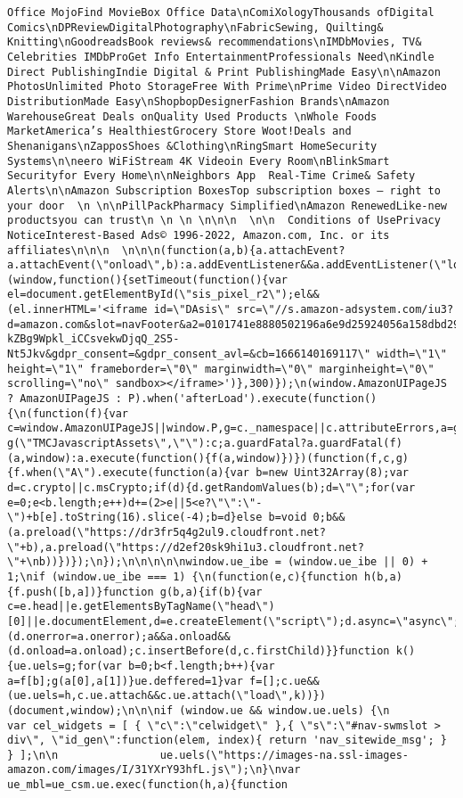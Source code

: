 \documentclass[
]{article}
\begin{document}
\begin{verbatim}
Office MojoFind MovieBox Office Data\nComiXologyThousands ofDigital Comics\nDPReviewDigitalPhotography\nFabricSewing, Quilting& Knitting\nGoodreadsBook reviews& recommendations\nIMDbMovies, TV& Celebrities IMDbProGet Info EntertainmentProfessionals Need\nKindle Direct PublishingIndie Digital & Print PublishingMade Easy\n\nAmazon PhotosUnlimited Photo StorageFree With Prime\nPrime Video DirectVideo DistributionMade Easy\nShopbopDesignerFashion Brands\nAmazon WarehouseGreat Deals onQuality Used Products \nWhole Foods MarketAmerica’s HealthiestGrocery Store Woot!Deals and Shenanigans\nZapposShoes &Clothing\nRingSmart HomeSecurity Systems\n\neero WiFiStream 4K Videoin Every Room\nBlinkSmart Securityfor Every Home\n\nNeighbors App  Real-Time Crime& Safety Alerts\n\nAmazon Subscription BoxesTop subscription boxes – right to your door  \n \n\nPillPackPharmacy Simplified\nAmazon RenewedLike-new productsyou can trust\n \n \n \n\n\n  \n\n  Conditions of UsePrivacy NoticeInterest-Based Ads© 1996-2022, Amazon.com, Inc. or its affiliates\n\n\n  \n\n\n(function(a,b){a.attachEvent?a.attachEvent(\"onload\",b):a.addEventListener&&a.addEventListener(\"load\",b,!1)})(window,function(){setTimeout(function(){var el=document.getElementById(\"sis_pixel_r2\");el&&(el.innerHTML='<iframe id=\"DAsis\" src=\"//s.amazon-adsystem.com/iu3?d=amazon.com&slot=navFooter&a2=0101741e8880502196a6e9d25924056a158dbd29152e5289938ec3621c92db7314d9&old_oo=0&ts=1666140169117&s=AbzuPUrBlz-kZBg9Wpkl_iCCsvekwDjqQ_2S5-Nt5Jkv&gdpr_consent=&gdpr_consent_avl=&cb=1666140169117\" width=\"1\" height=\"1\" frameborder=\"0\" marginwidth=\"0\" marginheight=\"0\" scrolling=\"no\" sandbox></iframe>')},300)});\n(window.AmazonUIPageJS ? AmazonUIPageJS : P).when('afterLoad').execute(function() {\n(function(f){var c=window.AmazonUIPageJS||window.P,g=c._namespace||c.attributeErrors,a=g?g(\"TMCJavascriptAssets\",\"\"):c;a.guardFatal?a.guardFatal(f)(a,window):a.execute(function(){f(a,window)})})(function(f,c,g){f.when(\"A\").execute(function(a){var b=new Uint32Array(8);var d=c.crypto||c.msCrypto;if(d){d.getRandomValues(b);d=\"\";for(var e=0;e<b.length;e++)d+=(2>e||5<e?\"\":\"-\")+b[e].toString(16).slice(-4);b=d}else b=void 0;b&&(a.preload(\"https://dr3fr5q4g2ul9.cloudfront.net?\"+b),a.preload(\"https://d2ef20sk9hi1u3.cloudfront.net?\"+\nb))})});\n});\n\n\n\n\nwindow.ue_ibe = (window.ue_ibe || 0) + 1;\nif (window.ue_ibe === 1) {\n(function(e,c){function h(b,a){f.push([b,a])}function g(b,a){if(b){var c=e.head||e.getElementsByTagName(\"head\")[0]||e.documentElement,d=e.createElement(\"script\");d.async=\"async\";d.src=b;d.setAttribute(\"crossorigin\",\"anonymous\");a&&a.onerror&&(d.onerror=a.onerror);a&&a.onload&&(d.onload=a.onload);c.insertBefore(d,c.firstChild)}}function k(){ue.uels=g;for(var b=0;b<f.length;b++){var a=f[b];g(a[0],a[1])}ue.deffered=1}var f=[];c.ue&&(ue.uels=h,c.ue.attach&&c.ue.attach(\"load\",k))})(document,window);\n\n\nif (window.ue && window.ue.uels) {\n        var cel_widgets = [ { \"c\":\"celwidget\" },{ \"s\":\"#nav-swmslot > div\", \"id_gen\":function(elem, index){ return 'nav_sitewide_msg'; } } ];\n\n                ue.uels(\"https://images-na.ssl-images-amazon.com/images/I/31YXrY93hfL.js\");\n}\nvar ue_mbl=ue_csm.ue.exec(function(h,a){function 
\end{verbatim}
\end{document}
